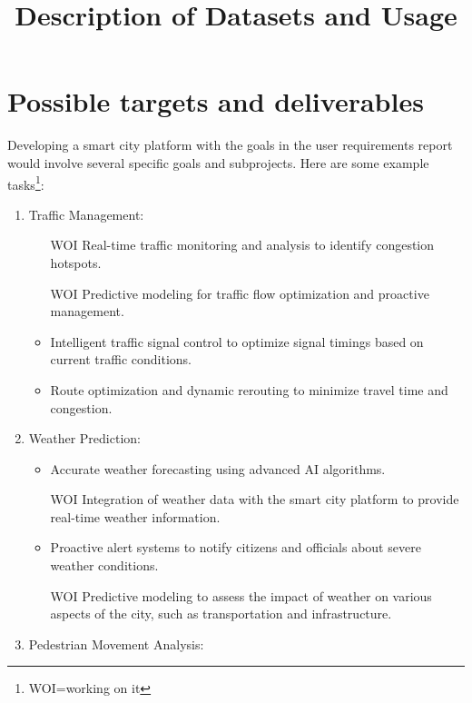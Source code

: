 \documentclass{intcov_report}
\title{Description of Datasets and Usage}
\begin{document}
\setcounter{page}{1}

\maketitle

\section{Possible targets and deliverables}

Developing a smart city platform with the goals in the user requirements report would involve several specific goals and subprojects. Here are some example tasks\footnote{WOI=working on it}:

\begin{enumerate}

\item Traffic Management:

 \begin{itemize}
  \item [WOI] Real-time traffic monitoring and analysis to identify congestion hotspots.
   \item [WOI] Predictive modeling for traffic flow optimization and proactive management.
   \item Intelligent traffic signal control to optimize signal timings based on current traffic conditions.
   \item Route optimization and dynamic rerouting to minimize travel time and congestion.
 \end{itemize}
 
 \item Weather Prediction:
 
  \begin{itemize}
   \item Accurate weather forecasting using advanced AI algorithms.
   \item [WOI] Integration of weather data with the smart city platform to provide real-time weather information.
   \item Proactive alert systems to notify citizens and officials about severe weather conditions.
   \item [WOI] Predictive modeling to assess the impact of weather on various aspects of the city, such as transportation and infrastructure.
   \end{itemize}

 \item Pedestrian Movement Analysis:
 

\end{enumerate}
\end{document}
